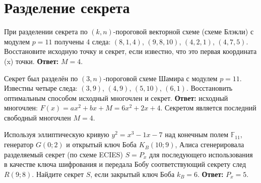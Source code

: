 \section{Разделение секрета}
\tasksection

\tasknumber При разделении секрета по $(k, n)$-пороговой векторной схеме (схеме Блэкли) с модулем $p = 11$ получены 4 следа: $\left( {8,1,4} \right)$, $\left( {9,8,10} \right)$, $\left( {4,2,1} \right)$, $\left( {4,7,5} \right)$. Восстановите исходную точку и секрет, если известно, что это первая координата (x) точки.
\medbreak
\textbf{Ответ:} $M = 4$.
\bigbreak

\tasknumber Секрет был разделён по $(3, n)$-пороговой схеме Шамира с модулем $p=11$. Известны четыре следа: $\left( {3,9} \right)$, $\left( {4,9} \right)$, $\left( {5,10} \right)$, $\left( {6,1} \right)$. Восстановить оптимальным способом исходный многочлен и секрет.
\medbreak
\textbf{Ответ:} исходный многочлен: $F\left( x \right) = ax^2  + bx + M = 6x^2  + 2x + 4$. Секретом является последний свободный многочлен $M = 4$.
\bigbreak

\tasknumber Используя эллиптическую кривую $y^2 = x^3 - 1x - 7$ над конечным полем $\mathbb{F}_{11}$, генератор $G(0; 2)$ и открытый ключ Боба $K_B(10; 9)$, Алиса сгенерировала разделяемый секрет (по схеме ECIES) $S=P_x$ для последующего использования в качестве ключа шифрования и передала Бобу соответствующий секрету след $R(9; 8)$. Найдите секрет $S$, если закрытый ключ Боба $k_B = 6$.
\medbreak
\textbf{Ответ:} $P_x = 5$.
